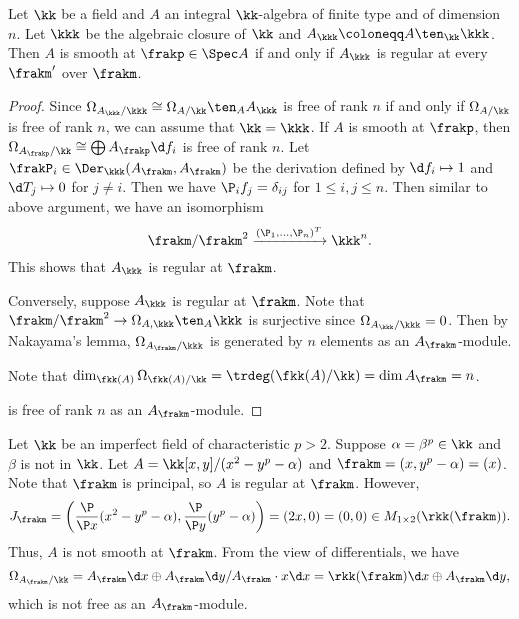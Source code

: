     
    \begin{proposition}\label{prop: smoothness is geometric regularity, affine version}
        Let \(\kk\) be a field and \(A\) an integral \(\kk\)-algebra of finite type and of dimension $n$.
        Let \(\kkk\) be the algebraic closure of \(\kk\) and \(A_\kkk \coloneqq A \ten_{\kk} \kkk\).
        Then \(A\) is smooth at \(\frakp \in \Spec A\) if and only if \(A_\kkk\) is regular at every \(\frakm'\) over \(\frakm\).
   \end{proposition}
    \begin{proof}
        Since \(\Omega_{A_\kkk/\kkk} \cong \Omega_{A/\kk} \ten_A A_\kkk\) is free of rank \(n\) if and only if \(\Omega_{A/\kk}\) is free of rank \(n\),
        we can assume that \(\kk = \kkk\).
        If \(A\) is smooth at \(\frakp\), then \(\Omega_{A_\frakp/\kk} \cong \bigoplus A_\frakp \d f_i\) is free of rank \(n\).
        Let \(\frakP_i \in \Der_\kkk(A_\frakm, A_\frakm)\) be the derivation defined by \(\d f_i \mapsto 1\) and \(\d T_j \mapsto 0\) for \(j \neq i\).
        Then we have \(\P_i f_j = \delta_{ij}\) for \(1 \leq i, j \leq n\).
        Then similar to above argument, we have an isomorphism
        \[ \frakm/\frakm^2 \xrightarrow{(\P_1,\ldots,\P_n)^T} \kkk^n. \]
        This shows that \(A_\kkk\) is regular at \(\frakm\).

        Conversely, suppose \(A_\kkk\) is regular at \(\frakm\).
        Note that \(\frakm/\frakm^2 \to \Omega_{A,\kkk} \ten_A \kkk\) is surjective since \(\Omega_{A_\kkk/\kkk} = 0\).
        Then by Nakayama's lemma, \(\Omega_{A_\frakm/\kkk}\) is generated by \(n\) elements as an \(A_\frakm\)-module.
        
        Note that \(\dim_{\fkk(A)} \Omega_{\fkk(A)/\kk} = \trdeg (\fkk(A)/\kk) = \dim A_\frakm = n\).

        \) is free of rank \(n\) as an \(A_\frakm\)-module.
        

    \end{proof}


    \begin{example}\label{eg: regular but not smooth}
        Let \(\kk\) be an imperfect field of characteristic \(p > 2\).
        Suppose \(\alpha = \beta^p \in \kk\) and \(\beta\) is not in \(\kk\).
        Let \(A = \kk[x,y]/(x^2 - y^p - \alpha)\) and \(\frakm = (x, y^p-\alpha) = (x)\).
        Note that \(\frakm\) is principal, so \(A\) is regular at \(\frakm\).
        However, 
        \[ J_\frakm = \left( \frac{\P }{\P x}(x^2-y^p-\alpha), \frac{\P}{\P y}(y^p-\alpha) \right) = \left( 2x, 0 \right) = (0,0) \in M_{1\times 2}(\rkk(\frakm)). \]
        Thus, \(A\) is not smooth at \(\frakm\).
        From the view of differentials, we have
        \[ \Omega_{A_\frakm/\kk} = A_\frakm \d x \oplus A_\frakm \d y / A_\frakm \cdot x\d x = \rkk(\frakm) \d x \oplus A_\frakm \d y, \]
        which is not free as an \(A_\frakm\)-module.
    \end{example}

